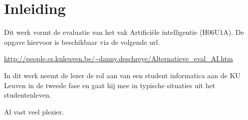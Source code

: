 \documentclass[alternative-exam.tex]{subfiles}
\begin{document}
\chapter*{Inleiding}
Dit werk vormt de evaluatie van het vak Artifici\"ele intelligentie (H06U1A). De opgave hiervoor is beschikbaar via de volgende url.
\begin{center}
\url{http://people.cs.kuleuven.be/~danny.deschreye/Alternatieve_eval_AI.htm}
\end{center}
In dit werk neemt de lezer de rol aan van een student informatica aan de KU Leuven in de tweede fase en gaat hij mee in typische situaties uit het studentenleven.

\vspace{1cm}
\noindent Al vast veel plezier.
\end{document}
